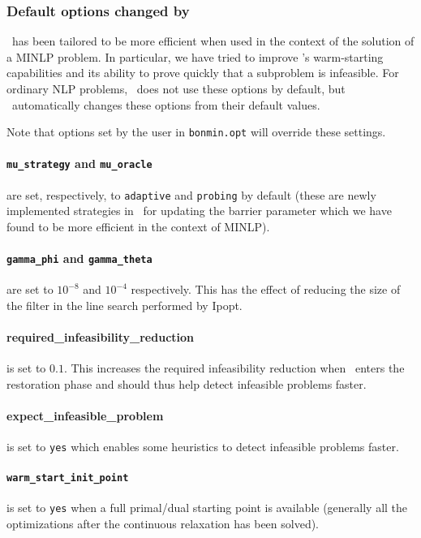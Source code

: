 \subsubsection{Default options changed by \Bonmin}
\Ipopt\ has been tailored to be more efficient when used in the context of the
solution of a MINLP problem. In particular, we have tried to
improve \Ipopt's warm-starting capabilities and its ability to prove quickly that a subproblem
is infeasible. For ordinary NLP problems, \Ipopt\ does not use these options
by default, but \Bonmin\ automatically changes these options from their default values.

Note that options set by the user in {\tt bonmin.opt} will override these
settings.

\paragraph{{\tt mu\_strategy} and {\tt mu\_oracle}} are set, respectively, to
{\tt adaptive} and {\tt probing} by default (these are newly implemented strategies in \Ipopt\
for updating the barrier parameter \cite{NocedalAdaptive} which we have found to be
more efficient in the context of MINLP).
\paragraph{{\tt gamma\_phi} and {\tt gamma\_theta}} are set to $10^{-8}$ and $10^{-4}$
respectively. This has the effect of reducing the size of the filter in the line search performed by Ipopt.

\paragraph{required\_infeasibility\_reduction} is set to $0.1$.
This increases the required infeasibility reduction when \Ipopt\ enters the
restoration phase and should thus help
detect infeasible problems faster.

\paragraph{expect\_infeasible\_problem} is set to {\tt yes} which enables some heuristics
to detect infeasible problems faster.

\paragraph{\tt warm\_start\_init\_point} is set to {\tt yes} when a full primal/dual starting
point is available (generally all the optimizations after the continuous relaxation has been solved).

